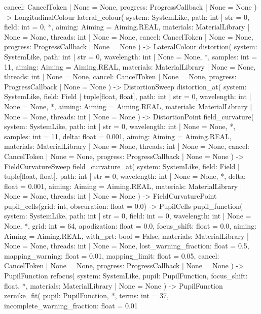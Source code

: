 \documentclass[11pt,a4paper,openany]{book}
\begin{document}
\begin{signatur}
    cancel: CancelToken | None = None,
    progress: ProgressCallback | None = None
) -> LongitudinalColour
lateral_colour(
    system: SystemLike,
    path: int | str = 0,
    field: int = 0,
    *,
    aiming: Aiming = Aiming.REAL,
    materials: MaterialLibrary | None = None,
    threads: int | None = None,
    cancel: CancelToken | None = None,
    progress: ProgressCallback | None = None
) -> LateralColour
distortion(
    system: SystemLike,
    path: int | str = 0,
    wavelength: int | None = None,
    *,
    samples: int = 11,
    aiming: Aiming = Aiming.REAL,
    materials: MaterialLibrary | None = None,
    threads: int | None = None,
    cancel: CancelToken | None = None,
    progress: ProgressCallback | None = None
) -> DistortionSweep
distortion_at(
    system: SystemLike,
    field: Field | tuple[float, float],
    path: int | str = 0,
    wavelength: int | None = None,
    *,
    aiming: Aiming = Aiming.REAL,
    materials: MaterialLibrary | None = None,
    threads: int | None = None
) -> DistortionPoint
field_curvature(
    system: SystemLike,
    path: int | str = 0,
    wavelength: int | None = None,
    *,
    samples: int = 11,
    delta: float = 0.001,
    aiming: Aiming = Aiming.REAL,
    materials: MaterialLibrary | None = None,
    threads: int | None = None,
    cancel: CancelToken | None = None,
    progress: ProgressCallback | None = None
) -> FieldCurvatureSweep
field_curvature_at(
    system: SystemLike,
    field: Field | tuple[float, float],
    path: int | str = 0,
    wavelength: int | None = None,
    *,
    delta: float = 0.001,
    aiming: Aiming = Aiming.REAL,
    materials: MaterialLibrary | None = None,
    threads: int | None = None
) -> FieldCurvaturePoint
pupil_cells(grid: int, obscuration: float = 0.0) -> PupilCells
pupil_function(
    system: SystemLike,
    path: int | str = 0,
    field: int = 0,
    wavelength: int | None = None,
    *,
    grid: int = 64,
    apodization: float = 0.0,
    focus_shift: float = 0.0,
    aiming: Aiming = Aiming.REAL,
    with_prt: bool = False,
    materials: MaterialLibrary | None = None,
    threads: int | None = None,
    lost_warning_fraction: float = 0.5,
    mapping_warning: float = 0.01,
    mapping_limit: float = 0.05,
    cancel: CancelToken | None = None,
    progress: ProgressCallback | None = None
) -> PupilFunction
refocus(
    system: SystemLike,
    pupil: PupilFunction,
    focus_shift: float,
    *,
    materials: MaterialLibrary | None = None
) -> PupilFunction
zernike_fit(
    pupil: PupilFunction,
    *,
    terms: int = 37,
    incomplete_warning_fraction: float = 0.01

\end{signatur}
\end{document}
